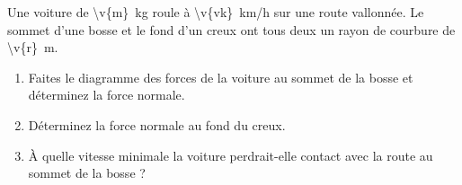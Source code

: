 Une voiture de \qty{\v{m}}{kg} roule à \qty{\v{vk}}{km/h} sur une route vallonnée. Le sommet d'une bosse et le fond d'un creux ont tous deux un rayon de courbure de \qty{\v{r}}{m}.

\begin{enumerate}[label=\alph*)]
    \item Faites le diagramme des forces de la voiture au sommet de la bosse et déterminez la force normale.
    \item Déterminez la force normale au fond du creux.
    \item À quelle vitesse minimale la voiture perdrait-elle contact avec la route au sommet de la bosse ?
\end{enumerate}
